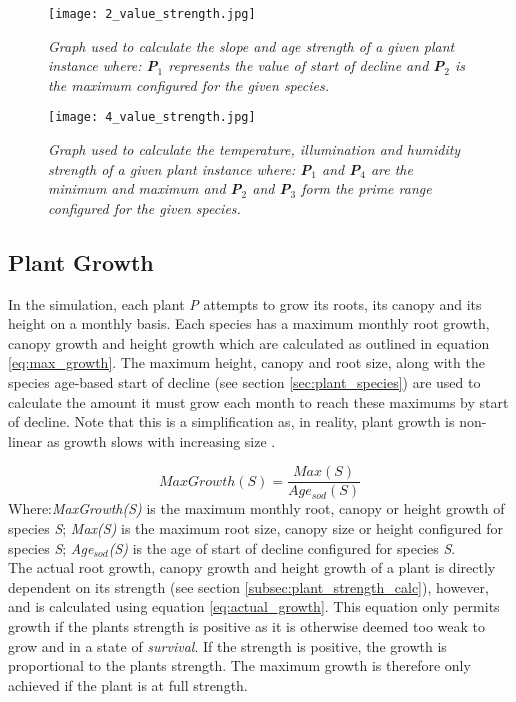 \begin{figure}
\center
	\texttt{[image: 2\_value\_strength.jpg]}
	\caption{ \textit{Graph used to calculate the slope and age strength of a given plant instance where: \textbf{P$_{1}$} represents the value of \textit{start of decline} and \textbf{P$_{2}$} is the \textit{maximum} configured for the given species.} }	
	\label{fig:2_value_strength}
\end{figure}

\begin{figure}
\center
	\texttt{[image: 4\_value\_strength.jpg]}
	\caption{ \textit{Graph used to calculate the temperature, illumination and humidity strength of a given plant instance where: \textbf{P$_{1}$} and \textbf{P$_{4}$} are the \textit{minimum} and \textit{maximum} and \textbf{P$_{2}$} and \textbf{P$_{3}$} form the \textit{prime range} configured for the given species.}  }	
	\label{fig:4_value_strength}
\end{figure}

\subsection{Plant Growth}

In the simulation, each plant \textit{P} attempts to grow its roots, its canopy and its height on a monthly basis. Each species has a maximum monthly root growth, canopy growth and height growth which are calculated as outlined in equation \ref{eq:max_growth}. The maximum height, canopy and root size, along with the species age-based start of decline (see section \ref{sec:plant_species}) are used to calculate the amount it must grow each month to reach these maximums by start of decline. Note that this is a simplification as, in reality, plant growth is non-linear as growth slows with increasing size \cite{Paine2012}.

\begin{equation}
MaxGrowth(S) = \frac{Max(S)}{Age_{sod}(S)}
\label{eq:max_growth}
\end{equation}
Where:\textit{MaxGrowth(S)} is the maximum monthly root, canopy or height growth of species \textit{S}; \textit{Max(S)} is the maximum root size, canopy size or height configured for species \textit{S}; \textit{Age$_{sod}$(S)} is the age of start of decline configured for species \textit{S}.\\

The actual root growth, canopy growth and height growth of a plant is directly dependent on its strength (see section \ref{subsec:plant_strength_calc}), however, and is calculated using equation \ref{eq:actual_growth}. This equation only permits growth if the plants strength is positive as it is otherwise deemed too weak to grow and in a state of \textit{survival}. If the strength is positive, the growth is proportional to the plants strength. The maximum growth is therefore only achieved if the plant is at full strength.\\

